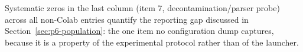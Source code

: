 \documentclass{article}
\begin{document}
Systematic zeros in the last column (item 7, decontamination/parser probe)
across all non-Colab entries quantify the reporting gap discussed in
Section~\ref{sec:p6-population}: the one item no configuration dump captures,
because it is a property of the experimental protocol rather than of the
launcher.
 

\end{document}
